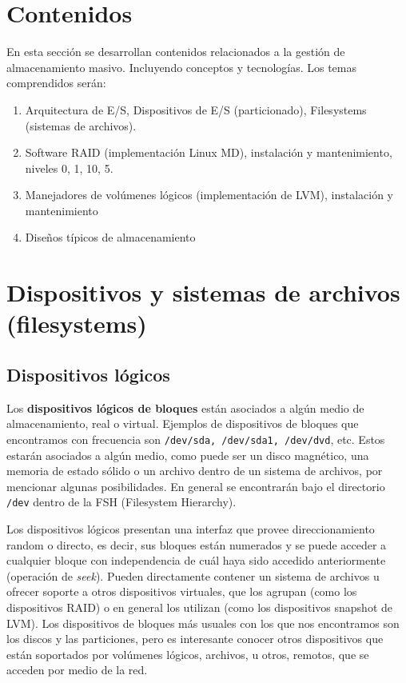 
\section{Contenidos}

En esta sección se desarrollan contenidos relacionados a la gestión de almacenamiento masivo. Incluyendo conceptos y tecnologías. Los temas comprendidos serán: 

\begin{enumerate}
	\item   Arquitectura de E/S, Dispositivos de E/S (particionado), Filesystems (sistemas de archivos). 
	\item	Software RAID (implementación Linux MD), instalación y mantenimiento, niveles 0, 1, 10, 5.
	\item	Manejadores de volúmenes lógicos (implementación de LVM), instalación y mantenimiento
	\item	Diseños típicos de almacenamiento
\end{enumerate}


\section{Dispositivos y sistemas de archivos (filesystems)}

\subsection{Dispositivos lógicos}
Los \textbf{dispositivos lógicos de bloques} están asociados a algún medio de almacenamiento, real o virtual.  Ejemplos de dispositivos de bloques que encontramos con frecuencia son \lstinline$/dev/sda, /dev/sda1, /dev/dvd$, etc. Estos estarán asociados a algún medio, como puede ser un disco  magnético, una memoria de estado sólido o un archivo dentro de un sistema de archivos, por mencionar algunas posibilidades. En general se encontrarán bajo el directorio \lstinline$/dev$ dentro de la FSH (Filesystem Hierarchy).


Los dispositivos lógicos presentan una interfaz que provee direccionamiento random o directo, es decir, sus bloques están numerados y se puede acceder a cualquier bloque con independencia de cuál haya sido accedido anteriormente (operación de \emph{seek}). Pueden directamente contener un sistema de archivos u ofrecer soporte a otros dispositivos virtuales, que los agrupan (como los dispositivos RAID) o en general los utilizan (como los dispositivos snapshot de LVM). Los dispositivos de bloques más usuales con los que nos encontramos son los discos y las particiones, pero es interesante conocer otros dispositivos que están soportados por volúmenes lógicos, archivos, u otros, remotos, que se acceden por medio de la red. 

